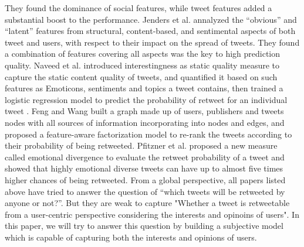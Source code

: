 \documentclass{acm_proc_article-sp}
\begin{document}
They found the dominance of social features, while tweet features added a substantial boost to the performance.
Jenders et al.\cite{Jenders:2013APV} annalyzed the “obvious” and “latent” features from structural, content-based, and sentimental aspects of both tweet and users, with respect to their impact on the spread of tweets. 
They found a combination of features covering all aspects was the key to high prediction quality.
Naveed et al.\cite{Naveed:2011SMC,2011:NaveedGKC} introduced interestingness as static quality measure to capture the static content quality of tweets, and quantified it based on such features as Emoticons, sentiments and topics a tweet contains, then trained a logistic regression model to predict the probability of retweet for an individual tweet .
Feng and Wang\cite{conf/wsdm/FengW13} built a graph made up of users, publishers and tweets nodes with all sources of information incorporating into nodes and edges, and proposed a feature-aware factorization model to re-rank the tweets according to their probability of being retweeted.
Pfitzner et al.\cite{conf/icwsm/PfitznerGS12} proposed a new measure called emotional divergence to evaluate the retweet probability of a tweet and showed that highly emotional diverse tweets can have up to almost five times higher chances of being retweeted.
From a global perspective, all papers listed above have tried to answer the question of “which tweets will be retweeted by anyone or not?”. 
But they are weak to capture "Whether a tweet is retweetable from a user-centric perspective considering the interests and opinoins of users". 
In this paper, we will try to answer this question by building a subjective model which is capable of capturing both the interests and opinions of users.
\end{document}
